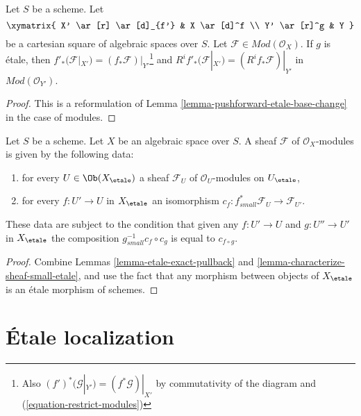 \begin{lemma}
\label{lemma-pushforward-etale-base-change-modules}
Let $S$ be a scheme. Let
$$
\xymatrix{
X' \ar[r] \ar[d]_{f'} & X \ar[d]^f \\
Y' \ar[r]^g & Y
}
$$
be a cartesian square of algebraic spaces over $S$. Let
$\mathcal{F} \in \textit{Mod}(\mathcal{O}_X)$. If $g$ is \'etale, then
$f'_*(\mathcal{F}|_{X'}) = (f_*\mathcal{F})|_{Y'}$\footnote{Also
$(f')^*(\mathcal{G}|_{Y'}) = (f^*\mathcal{G})|_{X'}$
by commutativity of the diagram and (\ref{equation-restrict-modules})} and
$R^if'_*(\mathcal{F}|_{X'}) = (R^if_*\mathcal{F})|_{Y'}$ in
$\textit{Mod}(\mathcal{O}_{Y'})$.
\end{lemma}

\begin{proof}
This is a reformulation of
Lemma \ref{lemma-pushforward-etale-base-change}
in the case of modules.
\end{proof}

\begin{lemma}
\label{lemma-characterize-module-small-etale}
Let $S$ be a scheme. Let $X$ be an algebraic space over $S$.
A sheaf $\mathcal{F}$ of $\mathcal{O}_X$-modules is given by the following
data:
\begin{enumerate}
\item for every $U \in \Ob(X_\etale)$ a sheaf
$\mathcal{F}_U$ of $\mathcal{O}_U$-modules on $U_\etale$,
\item for every $f : U' \to U$ in $X_\etale$ an isomorphism
$c_f : f_{small}^*\mathcal{F}_U \to \mathcal{F}_{U'}$.
\end{enumerate}
These data are subject to the condition that given any $f : U' \to U$
and $g : U'' \to U'$ in $X_\etale$ the composition
$g_{small}^{-1}c_f \circ c_g$ is equal to $c_{f \circ g}$.
\end{lemma}

\begin{proof}
Combine Lemmas \ref{lemma-etale-exact-pullback}
and \ref{lemma-characterize-sheaf-small-etale}, and use the fact that
any morphism between objects of $X_\etale$ is an \'etale morphism
of schemes.
\end{proof}







\section{\'Etale localization}
\label{section-localize}

